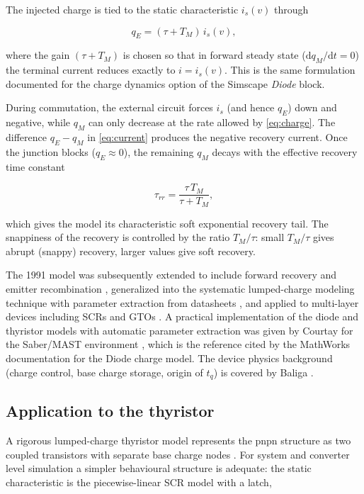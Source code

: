 \documentclass[11pt,a4paper]{article}
\begin{document}
The injected charge is tied to the static characteristic $i_s(v)$ through

\begin{equation}
  q_E = (\tau + T_M)\, i_s(v), \label{eq:qE}
\end{equation}

where the gain $(\tau + T_M)$ is chosen so that in forward steady state
($\mathrm{d}q_M/\mathrm{d}t = 0$) the terminal current reduces exactly to
$i = i_s(v)$. This is the same formulation documented for the charge dynamics
option of the Simscape \emph{Diode} block.

During commutation, the external circuit forces $i_s$ (and hence $q_E$) down
and negative, while $q_M$ can only decrease at the rate allowed by
\eqref{eq:charge}. The difference $q_E - q_M$ in \eqref{eq:current} produces
the negative recovery current. Once the junction blocks ($q_E \approx 0$), the
remaining $q_M$ decays with the effective recovery time constant

\begin{equation}
  \tau_{rr} = \frac{\tau\, T_M}{\tau + T_M},
\end{equation}

which gives the model its characteristic soft exponential recovery tail. The
snappiness of the recovery is controlled by the ratio $T_M/\tau$: small
$T_M/\tau$ gives abrupt (snappy) recovery, larger values give soft recovery.

The 1991 model was subsequently extended to include forward recovery and
emitter recombination \cite{ma1993}, generalized into the systematic
lumped-charge modeling technique with parameter extraction from datasheets
\cite{ma1997}, and applied to multi-layer devices including SCRs and GTOs
\cite{ma1994}. A practical implementation of the diode and thyristor models
with automatic parameter extraction was given by Courtay for the Saber/MAST
environment \cite{courtay1995}, which is the reference cited by the MathWorks
documentation for the Diode charge model. The device physics background
(charge control, base charge storage, origin of $t_q$) is covered by Baliga
\cite{baliga2019}.

\subsection{Application to the thyristor}

A rigorous lumped-charge thyristor model represents the pnpn structure as two
coupled transistors with separate base charge nodes \cite{ma1994}. For system
and converter level simulation a simpler behavioural structure is adequate:
the static characteristic is the piecewise-linear SCR model with a latch,
\end{document}
